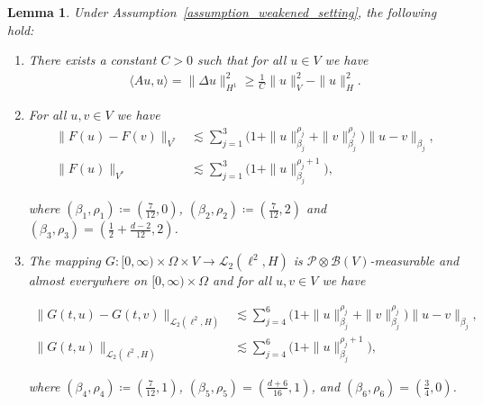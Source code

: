 \documentclass[reqno]{amsart}
\newtheorem{lemma}[Satz]{Lemma}
\newcommand{\sP}{\mathscr{P}}
\newcommand{\sB}{\mathscr{B}}
\newcommand{\sL}{\mathscr{L}}
\newcommand{\1}{\mathbf{1}}
\begin{document}
\begin{lemma} \label{lem:weakened_estimatesAFG}
Under Assumption~\ref{assumption_weakened_setting}, the following hold:
\begin{enumerate}[label=(\alph*)]
\item\label{lemItem:weakenedEstimatesA} There exists a constant $C > 0$ such that for all $u\in V$ we have
\begin{align}
     \langle Au,u \rangle= \| \Delta u\|^2_{H^1} \geq \frac{1}{C} \|u \|^2_{V}-\|u \|^2_H.
\end{align}
\item\label{lemItem:weakenedEstimatesF} For all $u,v\in V$ we have 
\begin{align}\label{eq:FestimatesLocWP}
    \|F(u)-F(v) \|_{V^\ast} &\lesssim \sum_{j=1}^3 \big(1+\|u \|_{\beta_j}^{\rho_j}+\|v \|^{\rho_j} _{\beta_j}\big)\| u-v\|_{\beta_j},\\
     \|F(u) \|_{V^\ast} &\lesssim \sum_{j=1}^3 \big(1+\|u \|_{\beta_j}^{\rho_j+1}\big),
\end{align}

where $(\beta_1, \rho_1) \coloneq (\frac{7}{12}, 0)$, $(\beta_2, \rho_2) \coloneq  ( \frac{7}{12}, 2 )$ and $(\beta_3, \rho_3) = ( \frac{1}{2}+\frac{d-2}{12}, 2 )$.


\item\label{lemItem:weakenedEstimatesG} 
The mapping $G:[0,\infty)\times \Omega \times V \to \sL_2(\ell^2,H)$ is $\sP\otimes \sB(V)$-measurable and almost everywhere on $[0, \infty) \times \Omega$ and for all $u, v \in V$ we have


\begin{align}\label{eq:GestimatesLocWP}
    \| G(t,u)-G(t,v) \|_{\sL_2(\ell^2,H)} &\lesssim \sum_{j=4}^6 \big(1+\|u \|_{\beta_j}^{\rho_j}+\|v \|^{\rho_j} _{\beta_j}\big)\| u-v\|_{\beta_j},\\
     \| G(t,u) \|_{\sL_2(\ell^2,H)} &\lesssim \sum_{j=4}^6 \big(1+\|u \|_{\beta_j}^{\rho_j+1}\big),
\end{align}

where $(\beta_4,\rho_4) \coloneq  (\frac{7}{12},1)$, $(\beta_5,\rho_5) = (\frac{d+6}{16},1)$, and $(\beta_6,\rho_6) = (\frac{3}{4},0)$.
\end{enumerate}
\end{lemma}
\end{document}
